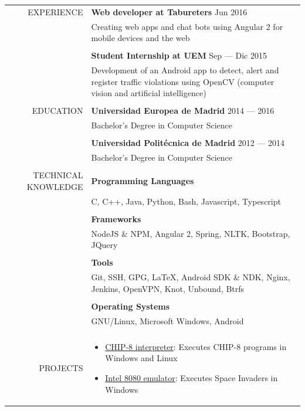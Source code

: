 \documentclass[a4paper, 11pt]{article}
\begin{document}
    \begin{longtable}{rp{11cm}}
        EXPERIENCE
        & {\bf Web developer at Tabureters} \hfill Jun 2016\\
        & Creating web apps and chat bots using Angular 2 for mobile devices and the web\\\\
        & {\bf Student Internship at UEM} \hfill Sep --- Dic 2015\\
        &  Development of an Android app to detect, alert and register traffic violations using OpenCV (computer vision and artificial intelligence)\\
        \\
        EDUCATION
        & {\bf Universidad Europea de Madrid} \hfill 2014 --- 2016\\
        & Bachelor's Degree in Computer Science\\\\
        & {\bf Universidad Politécnica de Madrid} \hfill 2012 --- 2014\\
        & Bachelor's Degree in Computer Science\\\\
        TECHNICAL KNOWLEDGE
        & {\bf Programming Languages}\\
        & C, C++, Java, Python, Bash, Javascript, Typescript\\\\
        & {\bf Frameworks}\\
        & NodeJS \& NPM, Angular 2, Spring, NLTK, Bootstrap, JQuery\\\\
        & {\bf Tools}\\
        & Git, SSH, GPG, \LaTeX, Android SDK \& NDK, Nginx, Jenkins, OpenVPN, Knot, Unbound, Btrfs\\\\
        & {\bf Operating Systems}\\
        & GNU/Linux, Microsoft Windows, Android\\
        \\
        PROJECTS
        & \vspace{-8mm}
        \begin{itemize}[leftmargin=0cm,label={}]
            \item \href{https://github.com/hugo19941994/CHIP8-Emu}{CHIP-8 interpreter}: Executes CHIP-8 programs in Windows and Linux
            \item \href{https://github.com/hugo19941994/SpaceInvaders-Emu}{Intel 8080 emulator}: Executes Space Invaders in Windows

\end{itemize}
\end{longtable}
\end{document}
